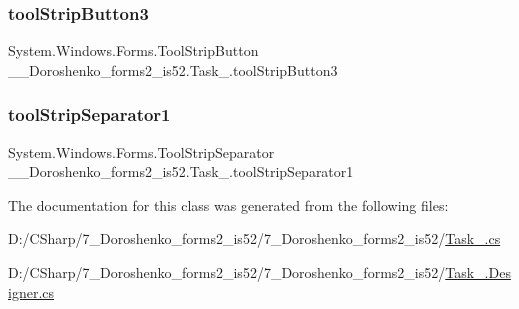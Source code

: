 \hypertarget{class__7___doroshenko__forms2__is52_1_1_task__4_af586497accc2f3831a9b90eaad5d062f}{}\label{class__7___doroshenko__forms2__is52_1_1_task__4_af586497accc2f3831a9b90eaad5d062f} 
\subsubsection{\texorpdfstring{tool\+Strip\+Button3}{toolStripButton3}}
{\footnotesize\ttfamily System.\+Windows.\+Forms.\+Tool\+Strip\+Button \+\_\+\_\+\+Doroshenko\+\_\+forms2\+\_\+is52.\+Task\+\_.\+tool\+Strip\+Button3\hspace{0.3cm}{\ttfamily [protected]}}

\hypertarget{class__7___doroshenko__forms2__is52_1_1_task__4_aaec220fabcd56417d4188ebbb1ee1ab6}{}\label{class__7___doroshenko__forms2__is52_1_1_task__4_aaec220fabcd56417d4188ebbb1ee1ab6} 
\subsubsection{\texorpdfstring{tool\+Strip\+Separator1}{toolStripSeparator1}}
{\footnotesize\ttfamily System.\+Windows.\+Forms.\+Tool\+Strip\+Separator \+\_\+\_\+\+Doroshenko\+\_\+forms2\+\_\+is52.\+Task\+\_.\+tool\+Strip\+Separator1\hspace{0.3cm}{\ttfamily [private]}}



The documentation for this class was generated from the following files\+:\begin{DoxyCompactItemize}
\item 
D\+:/\+C\+Sharp/7\+\_\+\+Doroshenko\+\_\+forms2\+\_\+is52/7\+\_\+\+Doroshenko\+\_\+forms2\+\_\+is52/\hyperlink{_task__4_8cs}{Task\+\_.\+cs}\item 
D\+:/\+C\+Sharp/7\+\_\+\+Doroshenko\+\_\+forms2\+\_\+is52/7\+\_\+\+Doroshenko\+\_\+forms2\+\_\+is52/\hyperlink{_task__4_8_designer_8cs}{Task\+\_.\+Designer.\+cs}\end{DoxyCompactItemize}

